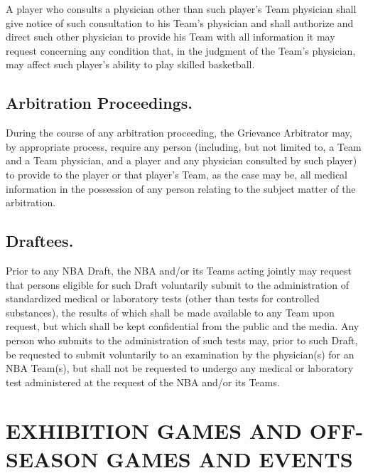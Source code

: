 \documentclass[
]{book}
\begin{document}
A player who consults a physician other than such player's Team physician shall give notice of such consultation to his Team's physician and shall authorize and direct such other physician to provide his Team with all information it may request concerning any condition that, in the judgment of the Team's physician, may affect such player's ability to play skilled basketball.

\hypertarget{arbitration-proceedings.}{%
\section{Arbitration Proceedings.}\label{arbitration-proceedings.}}

During the course of any arbitration proceeding, the Grievance Arbitrator may, by appropriate process, require any person (including, but not limited to, a Team and a Team physician, and a player and any physician consulted by such player) to provide to the player or that player's Team, as the case may be, all medical information in the possession of any person relating to the subject matter of the arbitration.

\hypertarget{draftees.}{%
\section{Draftees.}\label{draftees.}}

Prior to any NBA Draft, the NBA and/or its Teams acting jointly may request that persons eligible for such Draft voluntarily submit to the administration of standardized medical or laboratory tests (other than tests for controlled substances), the results of which shall be made available to any Team upon request, but which shall be kept confidential from the public and the media. Any person who submits to the administration of such tests may, prior to such Draft, be requested to submit voluntarily to an examination by the physician(s) for an NBA Team(s), but shall not be requested to undergo any medical or laboratory test administered at the request of the NBA and/or its Teams.

\hypertarget{exhibition-games-and-off-season-games-and-events}{%
\chapter{EXHIBITION GAMES AND OFF-SEASON GAMES AND EVENTS}\label{exhibition-games-and-off-season-games-and-events}}

\end{document}
